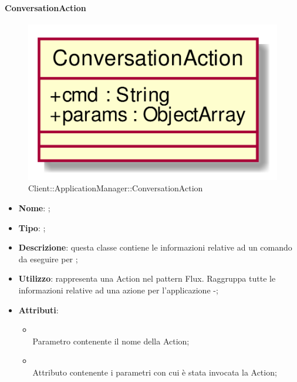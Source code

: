 \hypertarget{ConversationAction_label}{\paragraph{ConversationAction}}
\begin{figure}[h]
	\centering
	\includegraphics[width=\textwidth,height=\textheight,keepaspectratio]{images/ClassConversationAction.png}
	\caption{Client::ApplicationManager::ConversationAction}
\end{figure}
\begin{itemize}
	\item \textbf{Nome}: ;
	\item \textbf{Tipo}: ;
	\item \textbf{Descrizione}: questa classe contiene le informazioni relative ad un comando da eseguire per ;
	\item \textbf{Utilizzo}: rappresenta una Action nel pattern Flux. Raggruppa tutte le informazioni relative ad una azione per l'applicazione -;
	\item \textbf{Attributi}:
	\begin{itemize}
		\item[]  \\
		Parametro contenente il nome della Action;
		\item[]  \\
		Attributo contenente i parametri con cui è stata invocata la Action;
	\end{itemize}
\end{itemize}
\FloatBarrier

